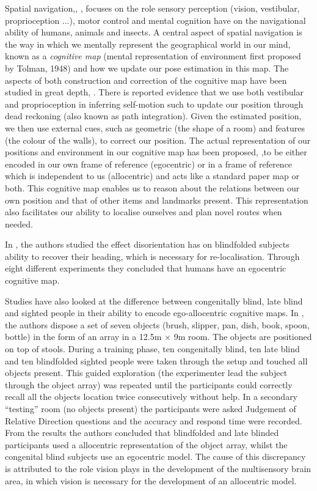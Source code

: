 Spatial navigation,\cite{Wang_2007}, \cite{what_det_our_nav_ability_2010}, focuses on the role sensory perception 
(vision, vestibular, proprioception ...), motor control and mental cognition have on the navigational ability of  
humans, animals and insects. A central aspect of spatial navigation is the way in which we mentally represent the geographical world in our mind, known as a \textit{cognitive map} (mental representation of environment first proposed by Tolman, 1948)
and how we update our pose estimation in this map. The aspects of both  construction and correction of the cognitive map have been studied in great depth, \cite{spatial_updating_2008}.
There is reported evidence that we use both vestibular and proprioception in inferring self-motion such to update our position through dead reckoning (also known as path integration). 
Given the estimated position, we then use external cues, such as geometric (the shape of a room) and features (the colour of the walls), 
to correct our position. The actual representation of our positions and environment in our cognitive map has been proposed,
\cite{spatial_memory_how_ego_allo_combine_2006},to be either encoded in our own frame of reference (egocentric) or in a frame of reference which 
is independent to us (allocentric) and acts like a standard paper map or both. This cognitive map enables us to reason about the relations between our own position and that of other items and landmarks present. 
This representation also facilitates our ability to localise ourselves and plan novel routes when needed.

In \cite{updating_egocentric_human_navigation_2000}, the authors studied the effect disorientation has on blindfolded subjects ability 
to recover their heading, which is necessary for re-localisation. Through eight different experiments they concluded that humans have an egocentric cognitive map.


Studies have also looked at the difference between congenitally blind, late blind and sighted people in their ability to encode ego-allocentric cognitive maps.
In \cite{Pasqualotto2013175}, the authors dispose a set of seven objects (brush, slipper, pan, dish, book, spoon, bottle) in the form of 
an array in a 12.5m $\times$ 9m room. The objects are positioned on top of stools. During a training phase, ten congenitally blind, ten late blind and ten blindfolded sighted people were taken through 
the setup and touched all objects present. This guided exploration (the experimenter lead the subject through the object array) was repeated until 
the participants could correctly recall all the objects location twice consecutively without help. In a secondary ``testing'' room (no objects present) 
the participants were asked Judgement of Relative Direction questions and the accuracy and respond time were recorded. From the results the authors 
concluded that blindfolded and late blinded participants used a allocentric representation of the object array, whilst the congenital blind 
subjects use an egocentric model. The cause of this discrepancy is attributed to the role vision plays in the development of the multisensory brain area, in
which vision is necessary for the development of an allocentric model. 

